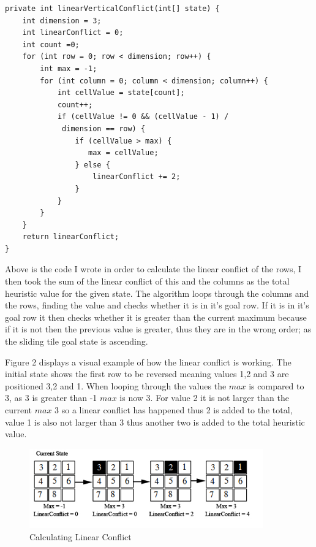 \documentclass[progress]{cmpreport}
\begin{document}
 
\begin{verbatim}
private int linearVerticalConflict(int[] state) {
    int dimension = 3;
    int linearConflict = 0;
    int count =0;
    for (int row = 0; row < dimension; row++) {
        int max = -1;
        for (int column = 0; column < dimension; column++) {
            int cellValue = state[count];
            count++;
            if (cellValue != 0 && (cellValue - 1) /
             dimension == row) {
                if (cellValue > max) {
                   max = cellValue;
                } else {
                    linearConflict += 2;
                }
            }
        }
    }
    return linearConflict;
}
\end{verbatim}

Above is the code I wrote in order to calculate the linear conflict of the rows, I then took the sum of the linear conflict of this and the columns as the total heuristic value for the given state. The algorithm loops through the columns and the rows, finding the value and checks whether it is in it's goal row. If it is in it's goal row it then checks whether it is greater than the current maximum because if it is not then the previous value is greater, thus they are in the wrong order; as the sliding tile goal state is ascending. 

Figure 2 displays a visual example of how the linear conflict is working. The initial state shows the first row to be reversed meaning values 1,2 and 3 are positioned 3,2 and 1. When looping through the values the $max$ is compared to 3, as 3 is greater than -1 $max$ is now 3. For value 2 it is not larger than the current $max$ 3 so a linear conflict has happened thus 2 is added to the total, value 1 is also not larger than 3 thus another two is added to the total heuristic value.


\begin{figure}[ht]
	\centering
	\includegraphics[width=0.9\textwidth]{linear}
	\captionsetup{justification=centering}
	\caption{Calculating Linear Conflict}
\end{figure}
\end{document}
